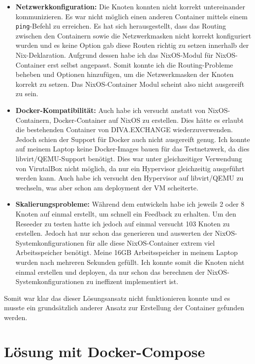 \begin{itemize}
    \item \textbf{Netzwerkkonfiguration:} Die Knoten konnten nicht korrekt untereinander kommunizieren. Es war nicht möglich einen anderen Container mittels einem \lstinline|ping|-Befehl zu erreichen.
        Es hat sich herausgestellt, dass das Routing zwischen den Containern sowie die Netzwerkmasken nicht korrekt konfiguriert wurden und es keine Option gab diese Routen richtig zu setzen innerhalb der Nix-Deklaration.
        Aufgrund dessen habe ich das NixOS-Modul für NixOS-Container erst selbst angepasst.
        Somit konnte ich die Routing-Probleme beheben und Optionen hinzufügen, um die Netzwerkmasken der Knoten korrekt zu setzen. %
        Das NixOS-Container Modul scheint also nicht ausgereift zu sein.
    \item \textbf{Docker-Kompatibilität:} Auch habe ich versucht anstatt von NixOS-Containern, Docker-Container auf NixOS zu erstellen.
        Dies hätte es erlaubt die bestehenden Container von DIVA.EXCHANGE wiederzuverwenden. Jedoch schien der Support für Docker auch nicht ausgereift genug.
        Ich konnte auf meinem Laptop keine Docker-Images bauen für das Testnetzwerk, da dies libvirt/QEMU-Support benötigt.
        Dies war unter gleichzeitiger Verwendung von VirutalBox nicht möglich, da nur ein Hypervisor gleichzeitig ausgeführt werden kann.
        Auch habe ich versucht den Hypervisor auf libvirt/QEMU zu wechseln, was aber schon am deployment der VM scheiterte.
    \item \textbf{Skalierungsprobleme:} Während dem entwickeln habe ich jeweils 2 oder 8 Knoten auf einmal erstellt, um schnell ein Feedback zu erhalten.
        Um den Reseeder zu testen hatte ich jedoch auf einmal versucht 103 Knoten zu erstellen.
        Jedoch hat nur schon das generieren und auswerten der NixOS-Systemkonfigurationen für alle diese NixOS-Container extrem viel Arbeitsspeicher benötigt.
        Meine 16GB Arbeitsspeicher in meinem Laptop wurden nach mehreren Sekunden gefüllt. Ich konnte somit die Knoten nicht einmal erstellen und deployen, da nur schon das berechnen der NixOS-Systemkonfigurationen zu ineffizent implementiert ist.
\end{itemize}
Somit war klar das dieser Lösungsansatz nicht funktionieren konnte und es musste ein grundsätzlich anderer Ansatz zur Erstellung der Container gefunden werden.

\section{Lösung mit Docker-Compose}

